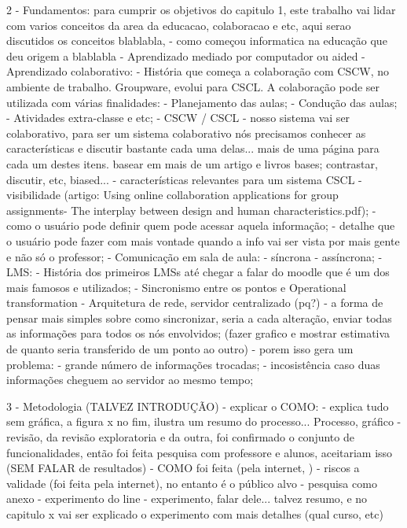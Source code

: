         2 - Fundamentos:
        para cumprir os objetivos do capitulo 1, este trabalho vai lidar com varios conceitos da area da educacao, colaboracao e etc, aqui serao discutidos os conceitos blablabla, 
            - como começou informatica na educação que deu origem a blablabla
            - Aprendizado mediado por computador ou aided
            - Aprendizado colaborativo:
                - História que começa a colaboração com CSCW, no ambiente de trabalho. Groupware, evolui para CSCL. A colaboração pode ser utilizada com várias finalidades:
                    - Planejamento das aulas;
                    - Condução das aulas;
                    - Atividades extra-classe e etc;
                - CSCW / CSCL
                    - nosso sistema vai ser colaborativo, para ser um sistema colaborativo nós precisamos conhecer as características e discutir bastante cada uma delas... mais de uma página para cada um destes itens. basear em mais de um artigo e livros bases; contrastar, discutir, etc, biased...
                    - características relevantes para um sistema CSCL
                        - visibilidade (artigo: Using online collaboration applications for group assignments- The interplay between design and human characteristics.pdf);
                    - como o usuário pode definir quem pode acessar aquela informação;
                    - detalhe que o usuário pode fazer com mais vontade quando a info vai ser vista por mais gente e não só o professor;
                        - Comunicação em sala de aula: 
                            - síncrona 
                            - assíncrona;
            - LMS:
                - História dos primeiros LMSs até chegar a falar do moodle que é um dos mais famosos e utilizados;
            - Sincronismo entre os pontos e Operational transformation
                - Arquitetura de rede, servidor centralizado (pq?)
                - a forma de pensar mais simples sobre como sincronizar, seria a cada alteração, enviar todas as informações para todos os nós envolvidos;
                (fazer grafico e mostrar estimativa de quanto seria transferido de um ponto ao outro)
                    - porem isso gera um problema: 
                        - grande número de informações trocadas;
                        - incosistência caso duas informações cheguem ao servidor ao mesmo tempo;


        3 - Metodologia (TALVEZ INTRODUÇÃO) - explicar o COMO:
            - explica tudo sem gráfica, a figura x no fim, ilustra um resumo do processo... Processo, gráfico
            - revisão, da revisão exploratoria e da outra, foi confirmado o conjunto de funcionalidades, então foi feita pesquisa com professore e alunos, aceitariam isso (SEM FALAR de resultados)
                - COMO foi feita (pela internet, )
                - riscos a validade (foi feita pela internet), no entanto é o público alvo
                - pesquisa como anexo
            - experimento do line
            - experimento, falar dele... talvez resumo, e no capitulo x vai ser explicado o experimento com mais detalhes (qual curso, etc)



